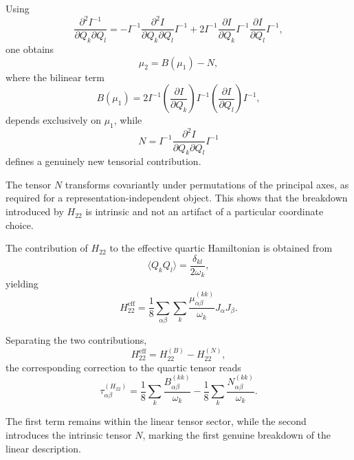 \documentclass[aip,jcp,reprint,floatfix]{revtex4-2}
\begin{document}
Using
\begin{equation}
\frac{\partial^2 I^{-1}}{\partial Q_k \partial Q_l}
=
- I^{-1} \frac{\partial^2 I}{\partial Q_k \partial Q_l} I^{-1}
+ 2 I^{-1} \frac{\partial I}{\partial Q_k} I^{-1}
\frac{\partial I}{\partial Q_l} I^{-1},
\end{equation}
one obtains
\begin{equation}
\mu_2 = B(\mu_1) - N,
\end{equation}
where the bilinear term
\begin{equation}
B(\mu_1) =
2 I^{-1}
\left(\frac{\partial I}{\partial Q_k}\right)
I^{-1}
\left(\frac{\partial I}{\partial Q_l}\right)
I^{-1},
\end{equation}
depends exclusively on $\mu_1$, while
\begin{equation}
N =
I^{-1}
\frac{\partial^2 I}{\partial Q_k \partial Q_l}
I^{-1}
\end{equation}
defines a genuinely new tensorial contribution.

The tensor $N$ transforms covariantly under permutations of the
principal axes, as required for a representation-independent object.
This shows that the breakdown introduced by $H_{22}$ is intrinsic and
not an artifact of a particular coordinate choice.

The contribution of $H_{22}$ to the effective quartic Hamiltonian is
obtained from
\begin{equation}
\langle Q_k Q_l \rangle = \frac{\delta_{kl}}{2\omega_k},
\end{equation}
yielding
\begin{equation}
H_{22}^{\mathrm{eff}}
=
\frac{1}{8}
\sum_{\alpha\beta}
\sum_k
\frac{\mu^{(kk)}_{\alpha\beta}}{\omega_k}
J_\alpha J_\beta.
\end{equation}

Separating the two contributions,
\begin{equation}
H_{22}^{\mathrm{eff}} = H_{22}^{(B)} - H_{22}^{(N)},
\end{equation}
the corresponding correction to the quartic tensor reads
\begin{equation}
\tau^{(H_{22})}_{\alpha\beta}
=
\frac{1}{8}
\sum_k
\frac{B^{(kk)}_{\alpha\beta}}{\omega_k}
-
\frac{1}{8}
\sum_k
\frac{N^{(kk)}_{\alpha\beta}}{\omega_k}.
\end{equation}

The first term remains within the linear tensor sector, while the
second introduces the intrinsic tensor $N$, marking the first genuine
breakdown of the linear description.
\end{document}
